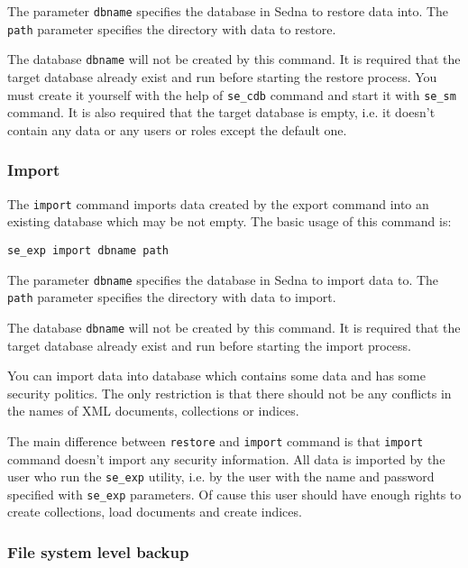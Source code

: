 \documentclass[a4paper,12pt]{article}
\begin{document}
The parameter \verb!dbname! specifies the database in Sedna to restore data
into. The \verb!path! parameter specifies the directory with data to restore.

The database \verb!dbname! will not be created by this command. It is required
that the target database already exist and run before starting the restore
process. You must create it yourself with the help of \verb!se_cdb! command and
start it with \verb!se_sm! command. It is also required that the target database
is empty, i.e. it doesn't contain any data or any users or roles except the
default one.


\subsubsection*{Import}

The \verb!import! command imports data created by the export command into an
existing database which may be not empty. The basic usage of this command is:

\begin{verbatim}
se_exp import dbname path
\end{verbatim}

The parameter \verb!dbname! specifies the database in Sedna to import data to.
The \verb!path! parameter specifies the directory with data to import.

The database \verb!dbname! will not be created by this command. It is required
that the target database already exist and run before starting the import
process.

You can import data into database which contains some data and has some security
politics. The only restriction is that there should not be any conflicts in the
names of XML documents, collections or indices.

The main difference between \verb!restore! and \verb!import! command is that
\verb!import! command doesn't import any security information. All data is
imported by the user who run the \verb!se_exp! utility, i.e. by the user with
the name and password specified with \verb!se_exp! parameters. Of cause this
user should have enough rights to create collections, load documents and create
indices.



\subsubsection{File system level backup}
\label{sec:file-system-level-backup}
\end{document}
